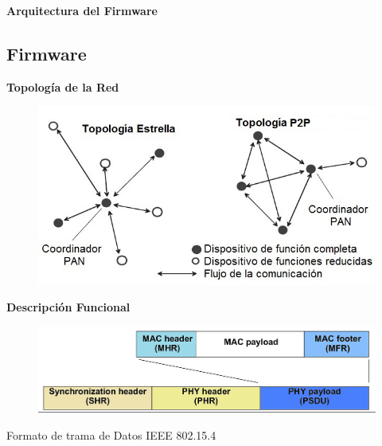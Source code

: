 \documentclass[aspectratio=43, handout]{beamer}
\begin{document}
\begin{frame}{\textbf{\LARGE{Arquitectura del Firmware}}}
\end{frame}

\subsection[Firmware]{Firmware}
\begin{frame}{\textbf{\LARGE{Topología de la Red}}}
		\begin{figure}[H]
			{\includegraphics[width=1\textwidth]{./imagenes/topologia.jpg}}
		\end{figure}	  	  	
\end{frame}

\begin{frame}{\textbf{\LARGE{Descripción Funcional}}}
\begin{figure}
	\centering
    \includegraphics[width=1\textwidth]{./imagenes/data.jpg}    	
\end{figure}
	\centering
	\noindent \LARGE{Formato de trama de Datos IEEE 802.15.4}
\end{frame}
\end{document}
